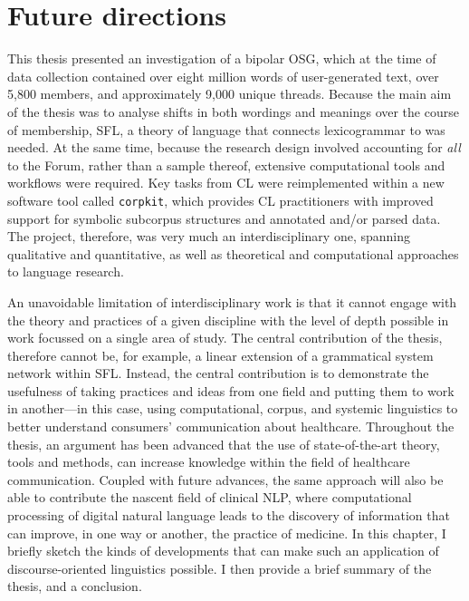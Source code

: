 
\chapter{Future directions} \label{chap:conclusion}

This thesis presented an investigation of a \gls{bipolar} \gls{OSG}, which at the time of data collection contained over eight million words of user\hyp{}generated text, over 5,800 \glspl{member}, and approximately 9,000 unique \glspl{thread}. Because the main aim of the thesis was to analyse shifts in both wordings and meanings over the course of membership, \gls{SFL}, a theory of language that connects \gls{lexicogrammar} to  was needed. At the same time, because the research design involved accounting for \emph{all}  to the \gls{Forum}, rather than a sample thereof, extensive computational tools and workflows were required. Key tasks from \gls{CL} were reimplemented within a new software tool called \texttt{corpkit}, which provides \gls{CL} practitioners with improved support for symbolic subcorpus structures and annotated and\slash or parsed data. The project, therefore, was very much an interdisciplinary one, spanning qualitative and quantitative, as well as theoretical and computational approaches to language research.

An unavoidable limitation of interdisciplinary work is that it cannot engage with the theory and practices of a given discipline with the level of depth possible in work focussed on a single area of study. The central contribution of the thesis, therefore cannot be, for example, a linear extension of a grammatical system network within \gls{SFL}. Instead, the central contribution is to demonstrate the usefulness of taking practices and ideas from one field and putting them to work in another---in this case, using computational, corpus, and systemic linguistics to better understand \glspl{consumer}' communication about healthcare. Throughout the thesis, an argument has been advanced that the use of state\hyp{}of\hyp{}the\hyp{}art theory, tools and methods, can increase knowledge within the field of healthcare communication. Coupled with future advances, the same approach will also be able to contribute the nascent field of clinical \gls{NLP}, where computational processing of digital natural language leads to the discovery of information that can improve, in one way or another, the practice of medicine. In this chapter, I briefly sketch the kinds of developments that can make such an application of discourse\hyp{}oriented linguistics possible. I then provide a brief summary of the thesis, and a conclusion.


